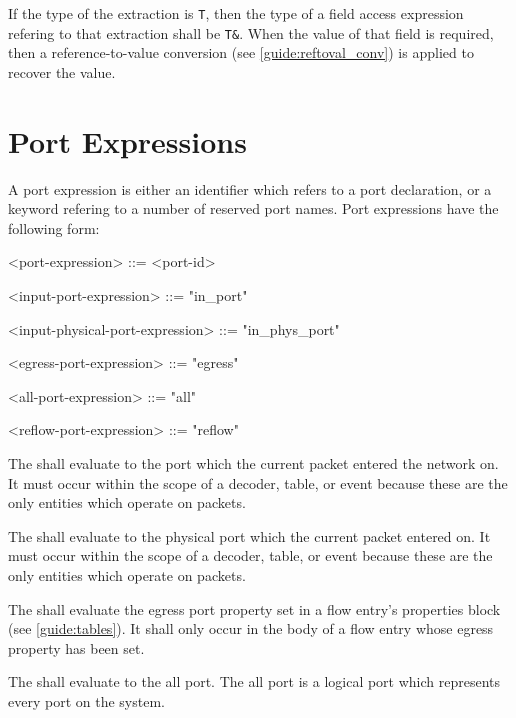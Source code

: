 If the type of the extraction is \texttt{T}, then the type of a field access expression refering to that extraction shall be \texttt{T\&}. When the value of that field is required, then a reference-to-value conversion (see \ref{guide:reftoval_conv}) is applied to recover the value.

\section{Port Expressions} \label{guide:port_expr}

A port expression is either an identifier which refers to a port declaration, or a keyword refering to a number of reserved port names. Port expressions have the following form:

\begin{minip}
\begin{grammar}
<port-expression> ::= <port-id>

<input-port-expression> ::= "in_port"

<input-physical-port-expression> ::= "in_phys_port"

<egress-port-expression> ::= "egress"

<all-port-expression> ::= "all"

<reflow-port-expression> ::= "reflow"
\end{grammar}
\end{minip} 

The  shall evaluate to the port which the current packet entered the network on. It must occur within the scope of a decoder, table, or event because these are the only entities which operate on packets.

The  shall evaluate to the physical port which the current packet entered on. It must occur within the scope of a decoder, table, or event because these are the only entities which operate on packets.

The  shall evaluate the egress port property set in a flow entry's properties block (see \ref{guide:tables}). It shall only occur in the body of a flow entry whose egress property has been set.

The  shall evaluate to the all port. The all port is a logical port which represents every port on the system.

